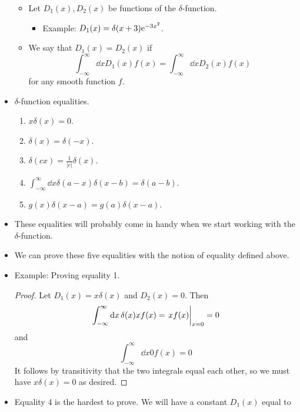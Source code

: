 \documentclass[../notes.tex]{subfiles}
\begin{document}
\begin{itemize}
\begin{itemize}
        \item Let $D_1(x),D_2(x)$ be functions of the $\delta$-function.
        \begin{itemize}
            \item Example: $D_1(x)=\delta(x+3)\e[-3x^2]$.
        \end{itemize}
        \item We say that $D_1(x)=D_2(x)$ if
        \begin{equation*}
            \int_{-\infty}^\infty\dd{x}D_1(x)f(x) = \int_{-\infty}^\infty\dd{x}D_2(x)f(x)
        \end{equation*}
        for any smooth function $f$.
    \end{itemize}
    \item $\delta$-function equalities.
    \begin{enumerate}
        \item $x\delta(x)=0$.
        \item $\delta(x)=\delta(-x)$.
        \item $\delta(cx)=\frac{1}{|c|}\delta(x)$.
        \item $\int_{-\infty}^\infty\dd{x}\delta(a-x)\delta(x-b)=\delta(a-b)$.
        \item $g(x)\delta(x-a)=g(a)\delta(x-a)$.
    \end{enumerate}
    \item These equalities will probably come in handy when we start working with the $\delta$-function.
    \item We can prove these five equalities with the notion of equality defined above.
    \item Example: Proving equality 1.
    \begin{proof}
        Let $D_1(x)=x\delta(x)$ and $D_2(x)=0$. Then
        \begin{equation*}
            \int_{-\infty}^\infty\dd{x}\delta(x)xf(x) = \eval{xf(x)}_{x=0} = 0
        \end{equation*}
        and
        \begin{equation*}
            \int_{-\infty}^\infty\dd{x}0f(x) = 0
        \end{equation*}
        It follows by transitivity that the two integrals equal each other, so we must have $x\delta(x)=0$ as desired.
    \end{proof}
    \item Equality 4 is the hardest to prove. We will have a constant $D_1(x)$ equal to
    \begin{equation*}

\end{equation*}
\end{itemize}
\end{document}
